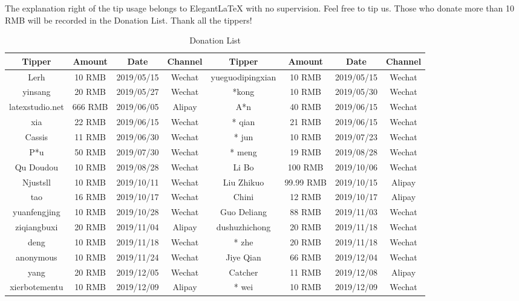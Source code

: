 \documentclass[11pt]{elegantbook}
\begin{document}
The explanation right of the tip usage belongs to Elegant\LaTeX{} with no supervision. Feel free to tip us. Those who donate more than 10 RMB will be recorded in the Donation List. Thank all the tippers!

\begin{table}[!htb]
  \centering
  \caption{Donation List}
  \begin{tabular}{*{4}{>{\scriptsize}c}|*{4}{>{\scriptsize}c}}
    \toprule
    \textbf{Tipper} & \textbf{Amount} & \textbf{Date} & \textbf{Channel} & \textbf{Tipper} & \textbf{Amount} & \textbf{Date} & \textbf{Channel} \\
    \midrule
    Lerh  & 10 RMB & 2019/05/15 & Wechat    & yueguodipingxian & 10 RMB & 2019/05/15 & Wechat \\
    yinsang    & 20 RMB & 2019/05/27 & Wechat    & *kong    & 10 RMB & 2019/05/30 & Wechat \\
    latexstudio.net & 666 RMB & 2019/06/05 & Alipay   & A*n   & 40 RMB & 2019/06/15 & Wechat \\
    * xia   & 22 RMB & 2019/06/15 & Wechat    & * qian  & 21 RMB  & 2019/06/15 & Wechat \\
    Cassis & 11 RMB & 2019/06/30 & Wechat    & * jun    & 10 RMB & 2019/07/23 & Wechat \\
    P*u   & 50 RMB & 2019/07/30 & Wechat    & * meng    & 19 RMB & 2019/08/28 & Wechat \\
    Qu Doudou   & 10 RMB & 2019/08/28 & Wechat    & Li Bo    & 100 RMB & 2019/10/06 & Wechat \\
    Njustsll & 10 RMB & 2019/10/11 & Wechat    & Liu Zhikuo   & 99.99 RMB & 2019/10/15 & Alipay \\
    * tao   & 16 RMB & 2019/10/17 & Wechat    & Chini    & 12 RMB & 2019/10/17 & Alipay \\
    yuanfengjing & 10 RMB & 2019/10/28 & Wechat    & Guo Deliang   & 88 RMB & 2019/11/03 & Wechat \\
    ziqiangbuxi  & 20 RMB & 2019/11/04 & Alipay   & dushuzhichong  & 20 RMB & 2019/11/18 & Wechat \\
    * deng    & 10 RMB & 2019/11/18 & Wechat    & * zhe   & 20 RMB & 2019/11/18 & Wechat \\
    anonymous    & 10 RMB & 2019/11/24 & Wechat    & Jiye Qian & 66 RMB & 2019/12/04 & Wechat \\
    * yang   & 20 RMB & 2019/12/05 & Wechat    & Catcher & 11 RMB & 2019/12/08 & Alipay \\
    xierbotementu & 10 RMB & 2019/12/09 & Alipay   & * wei   & 10 RMB & 2019/12/09 & Wechat \\

\end{tabular}
\end{table}
\end{document}
